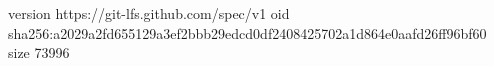 version https://git-lfs.github.com/spec/v1
oid sha256:a2029a2fd655129a3ef2bbb29edcd0df2408425702a1d864e0aafd26ff96bf60
size 73996
